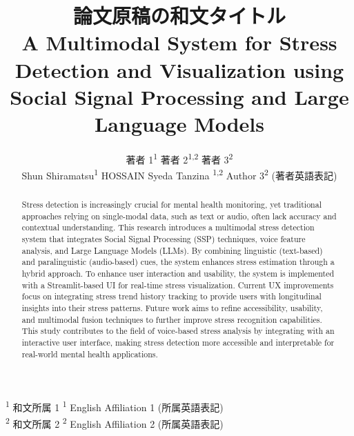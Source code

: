 \documentclass[a4j]{article}
\title{
    論文原稿の和文タイトル \\
    \vspace{0.2cm}
    \large A Multimodal System for Stress Detection and Visualization using Social Signal Processing and Large Language Models
}
\author{
    著者 1\textsuperscript{1} \quad 著者 2\textsuperscript{1,2} \quad 著者 3\textsuperscript{2} \\
    \vspace{0.2cm}
    Shun Shiramatsu\textsuperscript{1} \quad HOSSAIN Syeda Tanzina \textsuperscript{1,2} \quad Author 3\textsuperscript{2} (著者英語表記)
}
\date{}
\begin{document}
\maketitle

\noindent
\textsuperscript{1} 和文所属 1 \hspace{1cm} \textsuperscript{1} English Affiliation 1 (所属英語表記) \\
\textsuperscript{2} 和文所属 2 \hspace{1cm} \textsuperscript{2} English Affiliation 2 (所属英語表記)

\vspace{0.5cm}

\begin{abstract}
Stress detection is increasingly crucial for mental health monitoring, yet traditional approaches relying on single-modal data, such as text or audio, often lack accuracy and contextual understanding. This research introduces a multimodal stress detection system that integrates Social Signal Processing (SSP) techniques, voice feature analysis, and Large Language Models (LLMs). By combining linguistic (text-based) and paralinguistic (audio-based) cues, the system enhances stress estimation through a hybrid approach.
To enhance user interaction and usability, the system is implemented with a Streamlit-based UI for real-time stress visualization. Current UX improvements focus on integrating stress trend history tracking to provide users with longitudinal insights into their stress patterns. Future work aims to refine accessibility, usability, and multimodal fusion techniques to further improve stress recognition capabilities.
This study contributes to the field of voice-based stress analysis by integrating  with an interactive user interface, making stress detection more accessible and interpretable for real-world mental health applications.

\end{abstract}
\end{document}
